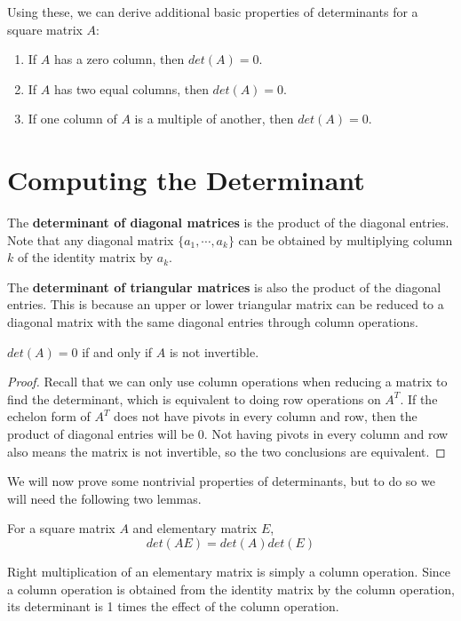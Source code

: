 Using these, we can derive additional basic properties of determinants for a square matrix $A$:
\begin{enumerate}
	\item If $A$ has a zero column, then $det(A) = 0$. 
	\item If $A$ has two equal columns, then $det(A) = 0$. 
	\item If one column of $A$ is a multiple of another, then $det(A) = 0$. 
\end{enumerate}

\section{Computing the Determinant}
The \textbf{determinant of diagonal matrices} is the product of the diagonal entries. Note that any diagonal matrix $\{a_{1}, \cdots, a_{k}\}$ can be obtained by multiplying column $k$ of the identity matrix by $a_{k}$. 

The \textbf{determinant of triangular matrices} is also the product of the diagonal entries. This is because an upper or lower triangular matrix can be reduced to a diagonal matrix with the same diagonal entries through column operations. 

\begin{theorem}
$det(A) = 0$ if and only if $A$ is not invertible. 
\end{theorem}

\begin{proof}
Recall that we can only use column operations when reducing a matrix to find the determinant, which is equivalent to doing row operations on $A^{T}$. If the echelon form of $A^{T}$ does not have pivots in every column and row, then the product of diagonal entries will be 0. Not having pivots in every column and row also means the matrix is not invertible, so the two conclusions are equivalent. 
\end{proof}

We will now prove some nontrivial properties of determinants, but to do so we will need the following two lemmas. 

\begin{lemma}
For a square matrix $A$ and elementary matrix $E$, 
$$det(AE) = det(A) det(E)$$
\end{lemma}

\begin{lproof}
Right multiplication of an elementary matrix is simply a column operation. Since a column operation is obtained from the identity matrix by the column operation, its determinant is 1 times the effect of the column operation. 
\end{lproof}

